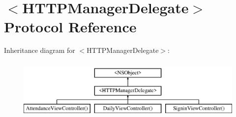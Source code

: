 \hypertarget{protocol_h_t_t_p_manager_delegate-p}{\section{$<$H\+T\+T\+P\+Manager\+Delegate$>$ Protocol Reference}
\label{protocol_h_t_t_p_manager_delegate-p}
}
Inheritance diagram for $<$H\+T\+T\+P\+Manager\+Delegate$>$\+:\begin{figure}[H]
\begin{center}
\leavevmode
\includegraphics[height=3.000000cm]{protocol_h_t_t_p_manager_delegate-p}
\end{center}
\end{figure}
